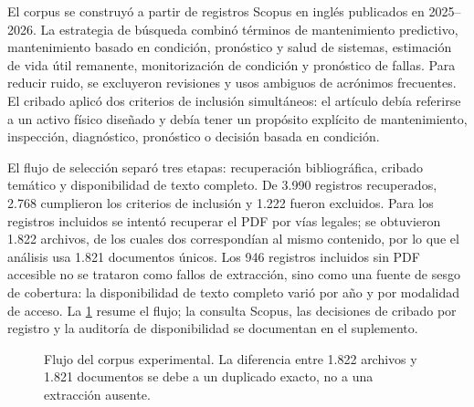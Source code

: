 \documentclass[11pt,a4paper]{article}
\newcommand{\RDF}{\textsc{rdf}}
\begin{document}
El corpus se construyó a partir de registros Scopus en inglés publicados en 2025--2026. La estrategia de búsqueda combinó términos de mantenimiento predictivo, mantenimiento basado en condición, pronóstico y salud de sistemas, estimación de vida útil remanente, monitorización de condición y pronóstico de fallas. Para reducir ruido, se excluyeron revisiones y usos ambiguos de acrónimos frecuentes. El cribado aplicó dos criterios de inclusión simultáneos: el artículo debía referirse a un activo físico diseñado y debía tener un propósito explícito de mantenimiento, inspección, diagnóstico, pronóstico o decisión basada en condición.

El flujo de selección separó tres etapas: recuperación bibliográfica, cribado temático y disponibilidad de texto completo. De 3.990 registros recuperados, 2.768 cumplieron los criterios de inclusión y 1.222 fueron excluidos. Para los registros incluidos se intentó recuperar el PDF por vías legales; se obtuvieron 1.822 archivos, de los cuales dos correspondían al mismo contenido, por lo que el análisis usa 1.821 documentos únicos. Los 946 registros incluidos sin PDF accesible no se trataron como fallos de extracción, sino como una fuente de sesgo de cobertura: la disponibilidad de texto completo varió por año y por modalidad de acceso. La \cref{fig:flow-corpus} resume el flujo; la consulta Scopus, las decisiones de cribado por registro y la auditoría de disponibilidad se documentan en el suplemento.

\begin{figure}[t]
\centering
{}
\caption{Flujo del corpus experimental. La diferencia entre 1.822 archivos y 1.821 documentos se debe a un duplicado exacto, no a una extracción ausente.}
\label{fig:flow-corpus}
\end{figure}
\end{document}
